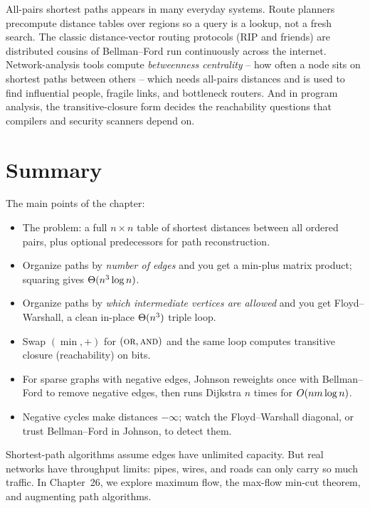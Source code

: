 \begin{aestheticbox}
All-pairs shortest paths appears in many everyday systems. Route planners
precompute distance tables over regions so a query is a lookup, not a fresh
search. The classic distance-vector routing protocols (RIP and friends) are
distributed cousins of Bellman--Ford run continuously across the internet.
Network-analysis tools compute \emph{betweenness centrality} -- how often a node
sits on shortest paths between others -- which needs all-pairs distances and is
used to find influential people, fragile links, and bottleneck routers. And in
program analysis, the transitive-closure form decides the reachability questions
that compilers and security scanners depend on.
\end{aestheticbox}

\section{Summary}
\label{ch25:summary}

\begin{recoverybox}
The main points of the chapter:
\begin{itemize}
\item The problem: a full $n \times n$ table of shortest distances between all
ordered pairs, plus optional predecessors for path reconstruction.
\item Organize paths by \emph{number of edges} and you get a min-plus matrix
product; squaring gives $\Theta(n^3 \log n)$.
\item Organize paths by \emph{which intermediate vertices are allowed} and you
get Floyd--Warshall, a clean in-place $\Theta(n^3)$ triple loop.
\item Swap $(\min, +)$ for $(\textsc{or}, \textsc{and})$ and the same loop
computes transitive closure (reachability) on bits.
\item For sparse graphs with negative edges, Johnson reweights once with
Bellman--Ford to remove negative edges, then runs Dijkstra $n$ times for
$O(n m \log n)$.
\item Negative cycles make distances $-\infty$; watch the Floyd--Warshall
diagonal, or trust Bellman--Ford in Johnson, to detect them.
\end{itemize}
\end{recoverybox}

Shortest-path algorithms assume edges have unlimited capacity. But real networks have throughput limits: pipes, wires, and roads can only carry so much traffic. In Chapter~26, we explore maximum flow, the max-flow min-cut theorem, and augmenting path algorithms.

